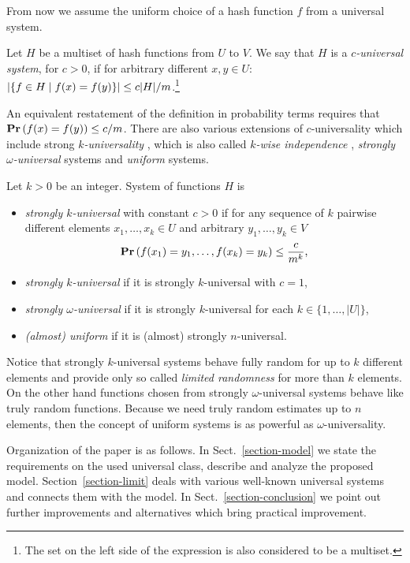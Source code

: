From now we assume the uniform choice of a hash function $f$ from a universal system.

\begin{definition}
\label{definition-c-universal-system}
Let $H$ be a multiset of hash functions from $U$ to $V$. We say that $H$ is a \emph{$c$-universal system}, for $c > 0$, if for arbitrary different $x, y \in U$: $\left|\lbrace f \in H \mid f(x) = f(y) \rbrace\right| \leq {c|H|}/{m}$.\footnote{The set on the left side of the expression is also considered to be a multiset.}
\end{definition}

An equivalent restatement of the definition in probability terms requires that $\mathbf{Pr}\left(f(x) = f(y)\right) \leq c/m$. There are also various extensions of $c$-universality which include strong \emph{$k$-universality} \cite{DBLP:conf/focs/WegmanC79}, which is also called \emph{$k$-wise independence} \cite{DBLP:conf/focs/WegmanC79}, \emph{strongly $\omega$-universal} \cite{DBLP:conf/focs/WegmanC79} systems and \emph{uniform} \cite{DBLP:journals/siamcomp/PaghP08} systems.
\begin{definition}
Let $k > 0$ be an integer. System of functions $H$ is
\begin{itemize}
	\item \emph{strongly $k$-universal} with constant $c > 0$ if for any sequence of $k$ pairwise different elements $x_1, \dots, x_k \in U$ and arbitrary $y_1, \dots, y_k \in V$ \[\mathbf{Pr}\left(f(x_1) = y_1, \dots, f(x_k) = y_k\right) \leq \frac{c}{m^k}\mbox{,}\]
	\item \emph{strongly $k$-universal} if it is strongly $k$-universal with $c = 1$,
	\item \emph{strongly $\omega$-universal} if it is strongly $k$-universal for each $k \in \{1, \dots, |U|\}$,
	\item \emph{(almost) uniform} if it is (almost) strongly $n$-universal.
\end{itemize}
\end{definition}

Notice that strongly $k$-universal systems behave fully random for up to $k$ different elements and provide only so called \emph{limited randomness} for more than $k$ elements. On the other hand functions chosen from strongly $\omega$-universal systems behave like truly random functions. Because we need truly random estimates up to $n$ elements, then the concept of uniform systems is as powerful as $\omega$-universality.

Organization of the paper is as follows. In Sect.~\ref{section-model} we state the requirements on the used universal class, describe and analyze the proposed model. Section~\ref{section-limit} deals with various well-known universal systems and connects them with the model. In Sect.~\ref{section-conclusion} we point out further improvements and alternatives which bring practical improvement.
